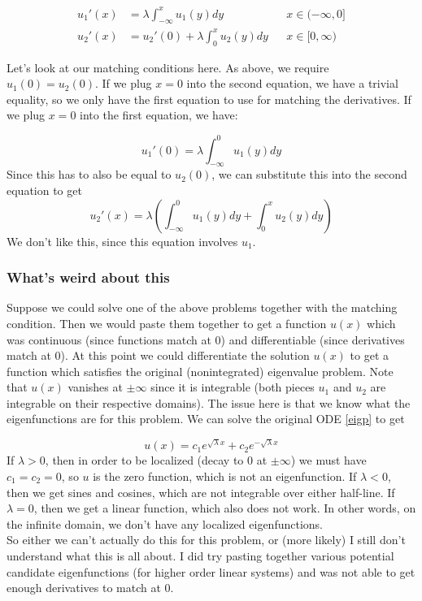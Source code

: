 \documentclass[12pt]{article}
\begin{document}
\begin{align}
u_1'(x) &= \lambda \int_{-\infty}^x u_1(y) dy && x \in (-\infty, 0] \\
u_2'(x) &= u_2'(0) + \lambda \int_0^x u_2(y) dy && x \in [0, \infty)
\end{align}

Let's look at our matching conditions here. As above, we require $u_1(0) = u_2(0)$. If we plug $x = 0$ into the second equation, we have a trivial equality, so we only have the first equation to use for matching the derivatives. If we plug $x = 0$ into the first equation, we have:

\[
u_1'(0) = \lambda \int_{-\infty}^0 u_1(y) dy
\]
Since this has to also be equal to $u_2(0)$, we can substitute this into the second equation to get
\[
u_2'(x) = \lambda \left( \int_{-\infty}^0 u_1(y) dy + \int_0^x u_2(y) dy \right)
\]
We don't like this, since this equation involves $u_1$.

\subsubsection*{What's weird about this}

Suppose we could solve one of the above problems together with the matching condition. Then we would paste them together to get a function $u(x)$ which was continuous (since functions match at 0) and differentiable (since derivatives match at 0). At this point we could differentiate the solution $u(x)$ to get a function which satisfies the original (nonintegrated) eigenvalue problem. Note that $u(x)$ vanishes at $\pm \infty$ since it is integrable (both pieces $u_1$ and $u_2$ are integrable on their respective domains). The issue here is that we know what the eigenfunctions are for this problem. We can solve the original ODE \eqref{eigp} to get 

\[
u(x) = c_1 e^{\sqrt{\lambda}x} + c_2 e^{-\sqrt{\lambda}x}
\]
If $\lambda > 0$, then in order to be localized (decay to 0 at $\pm \infty$) we must have $c_1 = c_2 = 0$, so $u$ is the zero function, which is not an eigenfunction. If $\lambda < 0$, then we get sines and cosines, which are not integrable over either half-line. If $\lambda = 0$, then we get a linear function, which also does not work. In other words, on the infinite domain, we don't have any localized eigenfunctions. \\

So either we can't actually do this for this problem, or (more likely) I still don't understand what this is all about. I did try pasting together various potential candidate eigenfunctions (for higher order linear systems) and was not able to get enough derivatives to match at 0.
\end{document}
